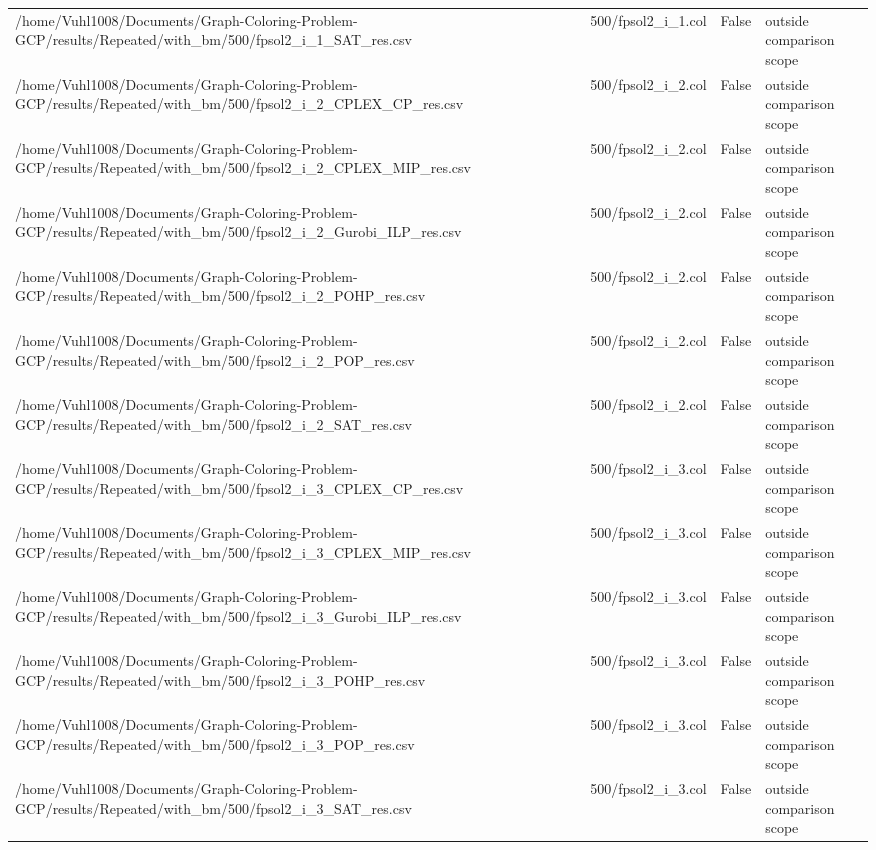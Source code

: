 \begin{table}[htbp]
\begin{tabular}{llll}
/home/Vuhl1008/Documents/Graph-Coloring-Problem-GCP/results/Repeated/with\_bm/500/fpsol2\_i\_1\_SAT\_res.csv & 500/fpsol2\_i\_1.col & False & outside comparison scope \\
/home/Vuhl1008/Documents/Graph-Coloring-Problem-GCP/results/Repeated/with\_bm/500/fpsol2\_i\_2\_CPLEX\_CP\_res.csv & 500/fpsol2\_i\_2.col & False & outside comparison scope \\
/home/Vuhl1008/Documents/Graph-Coloring-Problem-GCP/results/Repeated/with\_bm/500/fpsol2\_i\_2\_CPLEX\_MIP\_res.csv & 500/fpsol2\_i\_2.col & False & outside comparison scope \\
/home/Vuhl1008/Documents/Graph-Coloring-Problem-GCP/results/Repeated/with\_bm/500/fpsol2\_i\_2\_Gurobi\_ILP\_res.csv & 500/fpsol2\_i\_2.col & False & outside comparison scope \\
/home/Vuhl1008/Documents/Graph-Coloring-Problem-GCP/results/Repeated/with\_bm/500/fpsol2\_i\_2\_POHP\_res.csv & 500/fpsol2\_i\_2.col & False & outside comparison scope \\
/home/Vuhl1008/Documents/Graph-Coloring-Problem-GCP/results/Repeated/with\_bm/500/fpsol2\_i\_2\_POP\_res.csv & 500/fpsol2\_i\_2.col & False & outside comparison scope \\
/home/Vuhl1008/Documents/Graph-Coloring-Problem-GCP/results/Repeated/with\_bm/500/fpsol2\_i\_2\_SAT\_res.csv & 500/fpsol2\_i\_2.col & False & outside comparison scope \\
/home/Vuhl1008/Documents/Graph-Coloring-Problem-GCP/results/Repeated/with\_bm/500/fpsol2\_i\_3\_CPLEX\_CP\_res.csv & 500/fpsol2\_i\_3.col & False & outside comparison scope \\
/home/Vuhl1008/Documents/Graph-Coloring-Problem-GCP/results/Repeated/with\_bm/500/fpsol2\_i\_3\_CPLEX\_MIP\_res.csv & 500/fpsol2\_i\_3.col & False & outside comparison scope \\
/home/Vuhl1008/Documents/Graph-Coloring-Problem-GCP/results/Repeated/with\_bm/500/fpsol2\_i\_3\_Gurobi\_ILP\_res.csv & 500/fpsol2\_i\_3.col & False & outside comparison scope \\
/home/Vuhl1008/Documents/Graph-Coloring-Problem-GCP/results/Repeated/with\_bm/500/fpsol2\_i\_3\_POHP\_res.csv & 500/fpsol2\_i\_3.col & False & outside comparison scope \\
/home/Vuhl1008/Documents/Graph-Coloring-Problem-GCP/results/Repeated/with\_bm/500/fpsol2\_i\_3\_POP\_res.csv & 500/fpsol2\_i\_3.col & False & outside comparison scope \\
/home/Vuhl1008/Documents/Graph-Coloring-Problem-GCP/results/Repeated/with\_bm/500/fpsol2\_i\_3\_SAT\_res.csv & 500/fpsol2\_i\_3.col & False & outside comparison scope \\

\end{tabular}
\end{table}
